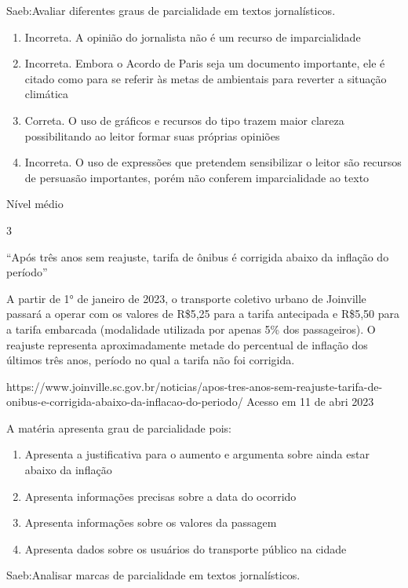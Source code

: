 {{\begin{escolha}
Saeb:Avaliar diferentes graus de parcialidade em textos jornalísticos.

\begin{enumerate}
\def\labelenumi{\arabic{enumi}.}
\item
  Incorreta. A opinião do jornalista não é um recurso de imparcialidade
\item
  Incorreta. Embora o Acordo de Paris seja um documento importante, ele
  é citado como para se referir às metas de ambientais para reverter a
  situação climática
\item
  Correta. O uso de gráficos e recursos do tipo trazem maior clareza
  possibilitando ao leitor formar suas próprias opiniões
\item
  Incorreta. O uso de expressões que pretendem sensibilizar o leitor são
  recursos de persuasão importantes, porém não conferem imparcialidade
  ao texto
\end{enumerate}

Nível médio

\num{3}

``Após três anos sem reajuste, tarifa de ônibus é corrigida abaixo da
inflação do período''

A partir de 1° de janeiro de 2023, o transporte coletivo urbano de
Joinville passará a operar com os valores de R\$5,25 para a tarifa
antecipada e R\$5,50 para a tarifa embarcada (modalidade utilizada por
apenas 5\% dos passageiros). O reajuste representa aproximadamente
metade do percentual de inflação dos últimos três anos, período no qual
a tarifa não foi corrigida.

https://www.joinville.sc.gov.br/noticias/apos-tres-anos-sem-reajuste-tarifa-de-onibus-e-corrigida-abaixo-da-inflacao-do-periodo/
Acesso em 11 de abri 2023

A matéria apresenta grau de parcialidade pois:

\begin{enumerate}
\def\labelenumi{\alph{enumi})}
\item
  Apresenta a justificativa para o aumento e argumenta sobre ainda estar
  abaixo da inflação
\item
  Apresenta informações precisas sobre a data do ocorrido
\item
  Apresenta informações sobre os valores da passagem
\item
  Apresenta dados sobre os usuários do transporte público na cidade
\end{enumerate}

Saeb:Analisar marcas de parcialidade em textos jornalísticos.


\end{escolha}}}
